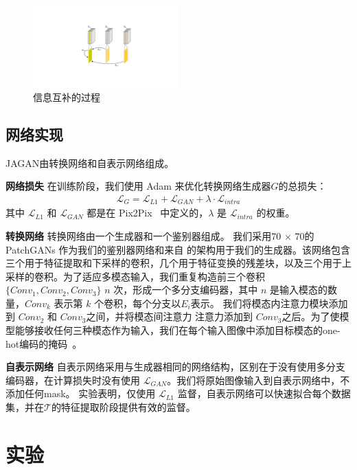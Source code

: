 \begin{figure}
	\centering
	\includegraphics[width=0.5\textwidth]{figures/JAGAN/20201109InterAttention_function_BV1_0.pdf}
	\caption[aaa]{信息互补的过程} 
	\label{fig:Complementary}
\end{figure}

\subsection{网络实现}

JAGAN由转换网络和自表示网络组成。

\textbf{网络损失} 在训练阶段，我们使用 Adam 来优化转换网络生成器$G$的总损失：
\begin{align}
	\mathcal{L}_G = \mathcal{L}_{L1} + \mathcal{L}_{GAN} + \lambda  \cdot \mathcal{L}_{intra}
\end{align}
其中 $\mathcal{L}_{L1}$ 和 $\mathcal{L}_{GAN}$ 都是在 Pix2Pix~\cite{pix2pix} 中定义的，$\lambda$ 是 $\mathcal{L}_{intra}$ 的权重。

\textbf{转换网络} 转换网络由一个生成器和一个鉴别器组成。 我们采用70 × 70的PatchGANs\cite{pix2pix} 作为我们的鉴别器网络和来自 \cite{perceptual} 的架构用于我们的生成器。该网络包含三个用于特征提取和下采样的卷积，几个用于特征变换的残差块，以及三个用于上采样的卷积。为了适应多模态输入，我们重复构造前三个卷积 $\{Conv_1, Conv_2, Conv_3\}$ $n$ 次，形成一个多分支编码器，其中 $n$ 是输入模态的数量，$ Conv_k$ 表示第 $k$ 个卷积，每个分支以$E_i$表示。 我们将模态内注意力模块添加到 $Conv_2$ 和 $Conv_3$之间，并将模态间注意力 注意力添加到 $Conv_3$之后。为了使模型能够接收任何三种模态作为输入，我们在每个输入图像中添加目标模态的one-hot编码的掩码~\cite{stargan,collagan}。

\textbf{自表示网络} 自表示网络采用与生成器相同的网络结构，区别在于没有使用多分支编码器，在计算损失时没有使用 $\mathcal{L}_{GAN}$。我们将原始图像输入到自表示网络中，不添加任何mask。 实验表明，仅使用 $\mathcal{L}_{L1}$ 监督，自表示网络可以快速拟合每个数据集，并在$\mathcal{T}$的特征提取阶段提供有效的监督。


\section{实验}

